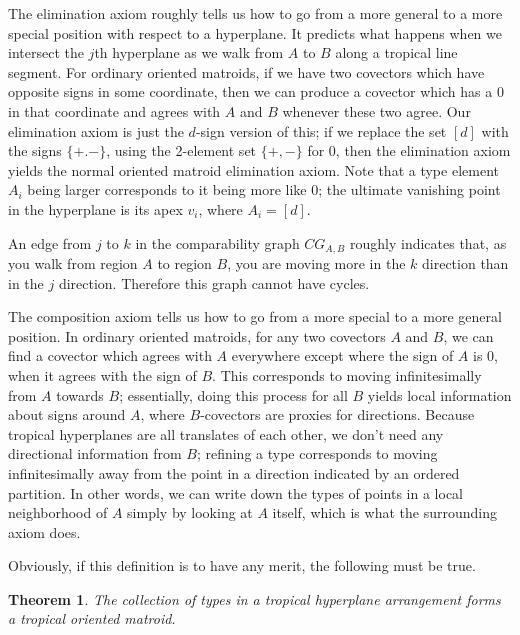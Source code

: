 \documentclass[11pt]{amsart}
\newtheorem{thm}{Theorem}[section]
\begin{document}
The elimination axiom roughly tells us how to go from a more general to a more special position with respect to a hyperplane. It predicts what happens when we intersect the $j$th hyperplane as we walk from $A$ to $B$ along a tropical line segment.
For ordinary oriented matroids, if we have two covectors which have opposite signs in some coordinate, then we can produce a covector which has a 0 in that coordinate and agrees with $A$ and $B$ whenever these two agree. Our elimination axiom is just the $d$-sign 
version of this; if we replace the set $[d]$ with the signs $\{+. -\}$, using the 2-element set $\{+, -\}$ for 0, then the elimination axiom yields 
the normal oriented matroid elimination axiom. Note that a type element $A_i$ being larger corresponds to it being more like 0; the ultimate vanishing point 
in the hyperplane is its apex $v_i$, where $A_i = [d]$.


An edge from $j$ to $k$ in the comparability graph $CG_{A,B}$ roughly indicates that, as you walk from region $A$ to region $B$, you are moving more in the $k$ direction than in the $j$ direction. Therefore this graph cannot have cycles.

The composition axiom tells us how to go from a more special to a more general position. In ordinary oriented matroids, for any two covectors $A$ and $B$, we can find a covector which agrees with $A$ everywhere except where the sign of $A$ is 0, when it agrees with the sign of $B$. This corresponds to moving infinitesimally from $A$ 
towards $B$; essentially, doing this process for all $B$ yields local information about signs around $A$, where $B$-covectors are proxies for 
directions. Because tropical hyperplanes are all translates of each other, we don't need any directional information from $B$; refining a type 
corresponds to moving infinitesimally away from the point in a direction indicated by an ordered partition. In other words, we can write down the types 
of points in a local neighborhood of $A$ simply by looking at $A$ itself, which is what the surrounding axiom does.

Obviously, if this definition is to have any merit, the following must be true.

\begin{thm}\label{thm:arr.is.om}
The collection of types in a tropical hyperplane arrangement forms a tropical oriented matroid.
\end{thm}
\end{document}

